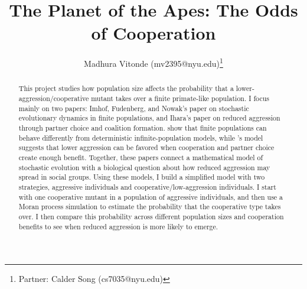 \documentclass[11pt]{article}
\title{\textbf{The Planet of the Apes: The Odds of Cooperation}}
\author{Madhura Vitonde (mv2395@nyu.edu)\footnote{Partner: Calder Song (cs7035@nyu.edu)}}
\date{}
\begin{document}
\maketitle

\begin{abstract}
This project studies how population size affects the probability that a lower-aggression/cooperative mutant takes over a finite primate-like population. I focus mainly on two papers: Imhof, Fudenberg, and Nowak's paper on stochastic evolutionary dynamics in finite populations, and Ihara's paper on reduced aggression through partner choice and coalition formation. \cite{Imhof2005} show that finite populations can behave differently from deterministic infinite-population models, while \cite{Ihara2020}'s model suggests that lower aggression can be favored when cooperation and partner choice create enough benefit. Together, these papers connect a mathematical model of stochastic evolution with a biological question about how reduced aggression may spread in social groups. Using these models, I build a simplified model with two strategies, aggressive individuals and cooperative/low-aggression individuals. I start with one cooperative mutant in a population of aggressive individuals, and then use a Moran process simulation to estimate the probability that the cooperative type takes over. I then compare this probability across different population sizes and cooperation benefits to see when reduced aggression is more likely to emerge.    
\end{abstract}
\bigskip
\end{document}
